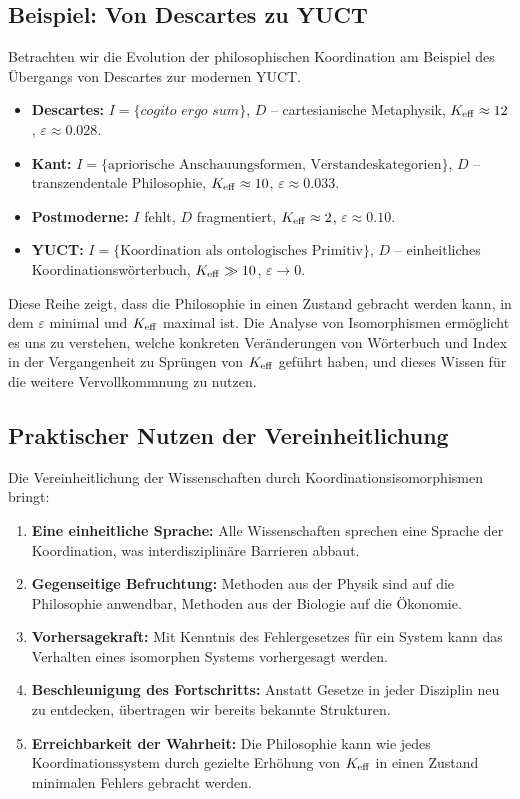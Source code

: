 \documentclass[12pt,a4paper]{article}
\newcommand{\eps}{\varepsilon}
\begin{document}
	\subsection{Beispiel: Von Descartes zu YUCT}
	
	Betrachten wir die Evolution der philosophischen Koordination am Beispiel des Übergangs von Descartes zur modernen YUCT.
	
	\begin{itemize}
		\item \textbf{Descartes:} \(I = \{\textit{cogito ergo sum}\}\), \(D\) – cartesianische Metaphysik, \(\Keff \approx 12\), \(\eps \approx 0.028\).
		\item \textbf{Kant:} \(I = \{\text{apriorische Anschauungsformen, Verstandeskategorien}\}\), \(D\) – transzendentale Philosophie, \(\Keff \approx 10\), \(\eps \approx 0.033\).
		\item \textbf{Postmoderne:} \(I\) fehlt, \(D\) fragmentiert, \(\Keff \approx 2\), \(\eps \approx 0.10\).
		\item \textbf{YUCT:} \(I = \{\text{Koordination als ontologisches Primitiv}\}\), \(D\) – einheitliches Koordinationswörterbuch, \(\Keff \gg 10\), \(\eps \to 0\).
	\end{itemize}
	
	Diese Reihe zeigt, dass die Philosophie in einen Zustand gebracht werden kann, in dem \(\eps\) minimal und \(\Keff\) maximal ist. Die Analyse von Isomorphismen ermöglicht es uns zu verstehen, welche konkreten Veränderungen von Wörterbuch und Index in der Vergangenheit zu Sprüngen von \(\Keff\) geführt haben, und dieses Wissen für die weitere Vervollkommnung zu nutzen.
	
	\subsection{Praktischer Nutzen der Vereinheitlichung}
	
	Die Vereinheitlichung der Wissenschaften durch Koordinationsisomorphismen bringt:
	
	\begin{enumerate}
		\item \textbf{Eine einheitliche Sprache:} Alle Wissenschaften sprechen eine Sprache der Koordination, was interdisziplinäre Barrieren abbaut.
		\item \textbf{Gegenseitige Befruchtung:} Methoden aus der Physik sind auf die Philosophie anwendbar, Methoden aus der Biologie auf die Ökonomie.
		\item \textbf{Vorhersagekraft:} Mit Kenntnis des Fehlergesetzes für ein System kann das Verhalten eines isomorphen Systems vorhergesagt werden.
		\item \textbf{Beschleunigung des Fortschritts:} Anstatt Gesetze in jeder Disziplin neu zu entdecken, übertragen wir bereits bekannte Strukturen.
		\item \textbf{Erreichbarkeit der Wahrheit:} Die Philosophie kann wie jedes Koordinationssystem durch gezielte Erhöhung von \(\Keff\) in einen Zustand minimalen Fehlers gebracht werden.
	\end{enumerate}
	
\end{document}
